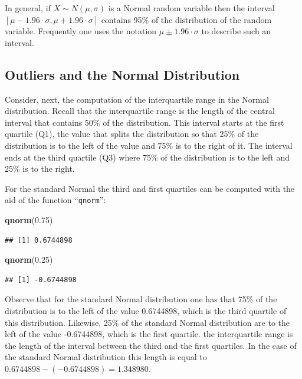 \documentclass[
]{krantz}
\makeatletter
\newenvironment{Shaded}{\begin{snugshade}}{\end{snugshade}}
\newcommand{\FloatTok}[1]{\textcolor[rgb]{0.00,0.00,0.81}{#1}}
\newcommand{\KeywordTok}[1]{\textcolor[rgb]{0.13,0.29,0.53}{\textbf{#1}}}
\newcommand{\NormalTok}[1]{#1}
\newenvironment{kframe}{%
\medskip{}
\setlength{\fboxsep}{.8em}
 \def\at@end@of@kframe{}%
 \ifinner\ifhmode%
  \def\at@end@of@kframe{\end{minipage}}%
  \begin{minipage}{\columnwidth}%
 \fi\fi%
 \def\FrameCommand##1{\hskip\@totalleftmargin \hskip-\fboxsep
 \colorbox{shadecolor}{##1}\hskip-\fboxsep
     \hskip-\linewidth \hskip-\@totalleftmargin \hskip\columnwidth}%
 \MakeFramed {\advance\hsize-\width
   \@totalleftmargin\z@ \linewidth\hsize
   \@setminipage}}%
 {\par\unskip\endMakeFramed%
 \at@end@of@kframe}
\renewenvironment{Shaded}{\begin{kframe}}{\end{kframe}}
\theoremstyle{definition}
\theoremstyle{definition}
\theoremstyle{definition}
\theoremstyle{remark}
\makeatother
\begin{document}
In general, if \(X \sim N(\mu,\sigma)\) is a Normal random variable then
the interval \([\mu - 1.96 \cdot \sigma, \mu + 1.96 \cdot \sigma]\)
contains 95\% of the distribution of the random variable. Frequently one
uses the notation \(\mu \pm 1.96 \cdot \sigma\) to describe such an
interval.

\hypertarget{outliers-and-the-normal-distribution}{%
\subsection{Outliers and the Normal Distribution}\label{outliers-and-the-normal-distribution}}

Consider, next, the computation of the interquartile range in the Normal
distribution. Recall that the interquartile range is the length of the
central interval that contains 50\% of the distribution. This interval
starts at the first quartile (Q1), the value that splits the
distribution so that 25\% of the distribution is to the left of the value
and 75\% is to the right of it. The interval ends at the third quartile
(Q3) where 75\% of the distribution is to the left and 25\% is to the
right.

For the standard Normal the third and first quartiles can be computed
with the aid of the function ``\texttt{qnorm}'':

\begin{Shaded}
\begin{Highlighting}[]
\KeywordTok{qnorm}\NormalTok{(}\FloatTok{0.75}\NormalTok{)}
\end{Highlighting}
\end{Shaded}

\begin{verbatim}
## [1] 0.6744898
\end{verbatim}

\begin{Shaded}
\begin{Highlighting}[]
\KeywordTok{qnorm}\NormalTok{(}\FloatTok{0.25}\NormalTok{)}
\end{Highlighting}
\end{Shaded}

\begin{verbatim}
## [1] -0.6744898
\end{verbatim}

Observe that for the standard Normal distribution one has that 75\% of
the distribution is to the left of the value 0.6744898, which is the
third quartile of this distribution. Likewise, 25\% of the standard
Normal distribution are to the left of the value -0.6744898, which is
the first quartile. the interquartile range is the length of the
interval between the third and the first quartiles. In the case of the
standard Normal distribution this length is equal to
\(0.6744898 - (-0.6744898) = 1.348980\).
\end{document}
